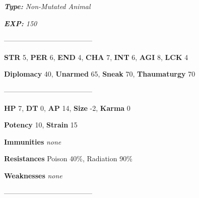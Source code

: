 \documentclass[11pt,a4paper,twocolumn]{book}
\begin{document}
	\noindent
	\emph{\textbf{Type:} Non-Mutated Animal}
	
	\noindent
	\emph{\textbf{EXP:} 150}
	
%		
%	
%		

	--------------------------------------

	\noindent
	\textbf{STR} 5, \textbf{PER} 6, \textbf{END} 4, \textbf{CHA} 7, \textbf{INT} 6, \textbf{AGI} 8, \textbf{LCK} 4
	
	\noindent
	\textbf{Diplomacy} 40, \textbf{Unarmed} 65, \textbf{Sneak} 70, \textbf{Thaumaturgy} 70
	
	--------------------------------------
	
	\noindent
	\textbf{HP} 7, \textbf{DT} 0, \textbf{AP} 14, \textbf{Size} -2, \textbf{Karma} 0
	
	\noindent
	\textbf{Potency} 10, \textbf{Strain} 15
	
	\noindent
	\textbf{Immunities} \emph{none} %
	
	\noindent
	\textbf{Resistances} Poison 40\%, Radiation 90\%%
	
	\noindent
	\textbf{Weaknesses} \emph{none}%
	
	--------------------------------------
	
\end{document}
